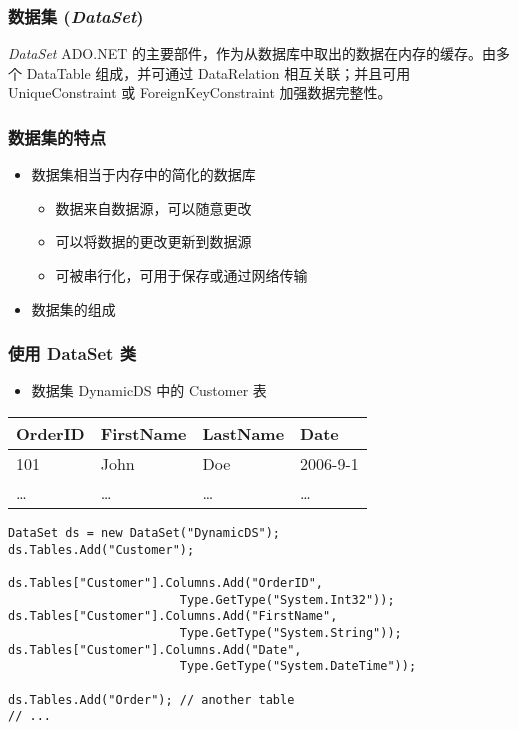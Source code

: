 \begin{frame}
\frametitle{数据集 (\textit{DataSet})}
\begin{block}{\textit{DataSet}}
\CJKindent ADO.NET 的主要部件，作为从数据库中取出的数据在内存的缓存。由多个
 DataTable 组成，并可通过  DataRelation 相互关联；并且可用 UniqueConstraint
或 ForeignKeyConstraint 加强数据完整性。
\end{block}
\begin{center}
  
\end{center}
\end{frame}

\begin{frame}
\frametitle{数据集的特点}
\begin{itemize}
\setlength{\itemsep}{6pt plus 1pt}
\item 数据集相当于内存中的简化的数据库
\begin{itemize}
\item 数据来自数据源，可以随意更改
\item 可以将数据的更改更新到数据源
\item 可被串行化，可用于保存或通过网络传输
\end{itemize}
\item 数据集的组成
\end{itemize}
\begin{center}
  
\end{center}
\end{frame}

\begin{frame}[fragile]
\frametitle{使用 DataSet 类}
\begin{center}
  
\begin{itemize}
\item 数据集  DynamicDS 中的 Customer 表
\end{itemize}
  \begin{tabular}{|l|l|l|l|}
    \hline
    \footnotesize \textbf{OrderID} & \footnotesize \textbf{FirstName} & \footnotesize \textbf{LastName} & \footnotesize \textbf{Date} \\
    \hline
    101              & John               & Doe               & 2006-9-1      \\
    \hline
    \dots            & \dots              & \dots             & \dots         \\
    \hline
  \end{tabular}
\end{center}
\begin{lstlisting}
DataSet ds = new DataSet("DynamicDS");
ds.Tables.Add("Customer");

ds.Tables["Customer"].Columns.Add("OrderID", 
                        Type.GetType("System.Int32"));
ds.Tables["Customer"].Columns.Add("FirstName", 
                        Type.GetType("System.String"));
ds.Tables["Customer"].Columns.Add("Date",
                        Type.GetType("System.DateTime"));

ds.Tables.Add("Order"); // another table
// ...
\end{lstlisting}
\end{frame}

